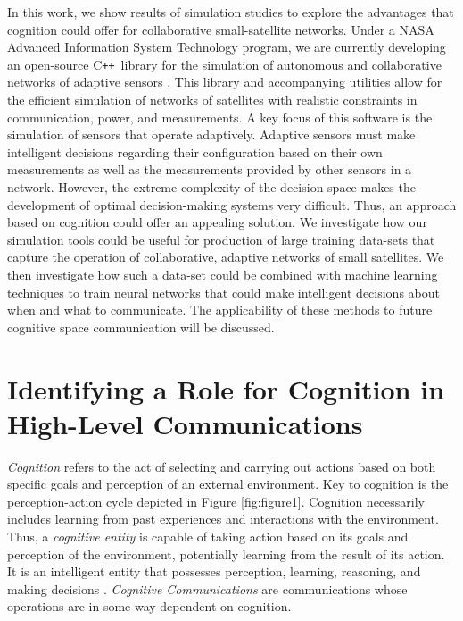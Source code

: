 \documentclass[conference]{IEEEtran}
\newcommand{\cpp}{C\texttt{++}~}
\begin{document}
In this work, we show results of simulation studies to explore the advantages
that cognition could offer for collaborative small-satellite networks.  Under a
NASA Advanced Information System Technology program, we are currently developing
an open-source \cpp library for the simulation of autonomous and collaborative
networks of adaptive sensors \cite{ref6}.  This library and accompanying
utilities allow for the efficient simulation of networks of satellites with
realistic constraints in communication, power, and measurements.  A key focus of
this software is the simulation of sensors that operate adaptively.  Adaptive
sensors must make intelligent decisions regarding their configuration based on
their own measurements as well as the measurements provided by other sensors in
a network.  However, the extreme complexity of the decision space makes the
development of optimal decision-making systems very difficult.  Thus, an
approach based on cognition could offer an appealing solution.  We investigate
how our simulation tools could be useful for production of large training
data-sets that capture the operation of collaborative, adaptive networks of
small satellites.  We then investigate how such a data-set could be combined
with machine learning techniques to train neural networks that could make
intelligent decisions about when and what to communicate.  The applicability of
these methods to future cognitive space communication will be discussed.


\section{Identifying a Role for Cognition in High-Level Communications} \label{sec:hlc}

\textit{Cognition} refers to the act of selecting and carrying out actions based
on both specific {\color{black} goals and perception of an external
environment}.  Key to cognition is the perception-action cycle depicted in
Figure \ref{fig:figure1}.  Cognition necessarily includes learning from past
experiences and {\color{black} interactions with the environment}.  Thus, a
\textit{cognitive entity} is capable of taking action based on its
{\color{black} goals and perception of the environment}, potentially learning
from the result of its action.  It is an intelligent entity that possesses
perception, learning, reasoning, and making decisions
\cite{ref7}. \textit{Cognitive Communications} are communications whose
operations are in some way dependent on cognition.
\end{document}
